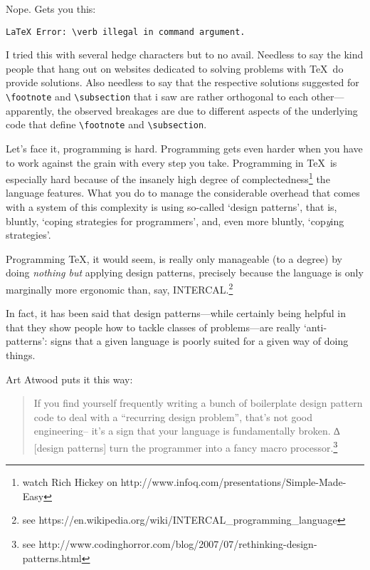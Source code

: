 Nope. Gets you this:

\begin{verbatim}
LaTeX Error: \verb illegal in command argument.
\end{verbatim}

I tried this with several hedge characters but to no avail. Needless to say the kind people that hang out on
websites dedicated to solving problems with \TeX\ do provide solutions. Also needless to say that the
respective solutions suggested for \verb#\footnote# and \verb#\subsection# that i saw are rather orthogonal
to each other---apparently, the observed breakages are due to different aspects of the underlying code that
define \verb#\footnote# and \verb#\subsection#.

Let's face it, programming is hard. Programming gets even harder when you have to work against the grain
with every step you take. Programming in \TeX\ is especially hard because of the insanely high degree of
complectedness\thinspace\footnote{watch Rich Hickey on http://www.infoq.com/presentations/Simple-Made-Easy}
the language features. What you do to manage the considerable overhead that comes with a system of this
complexity is using so-called `design patterns', that is, bluntly, `coping strategies for programmers',
and, even more bluntly, `cop{\em y}ing strategies'.

Programming \TeX, it would seem, is
really only manageable (to a degree) by doing {\em nothing but} applying design patterns, precisely because
the language is only marginally more ergonomic than, say, INTERCAL.\footnote{see
https://en.wikipedia.org/wiki/INTERCAL\_programming\_language}

In fact, it has been said that design patterns---while certainly being
helpful in that they show people how to tackle classes of problems---are really `anti-patterns': signs that
a given language is poorly suited for a given way of doing things.

Art Atwood puts it this way:

\begin{quote}If you find yourself frequently writing a bunch of boilerplate design pattern code to deal with
a ``recurring design problem'', that's not good engineering-- it's a sign that your language is fundamentally
broken. ∆ [design patterns] turn the programmer into a fancy macro processor.\footnote{see
http://www.codinghorror.com/blog/2007/07/rethinking-design-patterns.html}\end{quote}


